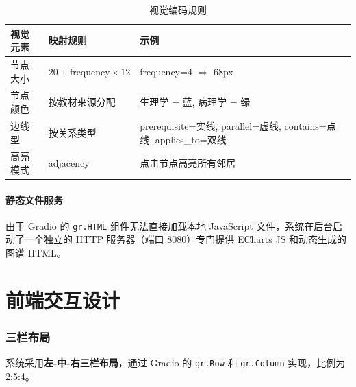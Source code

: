 \documentclass[12pt,a4paper]{article}
\begin{document}
\begin{table}[H]
\centering
\caption{视觉编码规则}
\begin{tabularx}{\textwidth}{llX}
\toprule
\textbf{视觉元素} & \textbf{映射规则} & \textbf{示例} \\
\midrule
节点大小 & $20 + \text{frequency} \times 12$ & frequency=4 $\Rightarrow$ 68px \\
节点颜色 & 按教材来源分配 & 生理学 = \textcolor[HTML]{5470C6}{蓝}, 病理学 = \textcolor[HTML]{91CC75}{绿} \\
边线型 & 按关系类型 & prerequisite=实线, parallel=虚线, contains=点线, applies\_to=双线 \\
高亮模式 & adjacency & 点击节点高亮所有邻居 \\
\bottomrule
\end{tabularx}
\end{table}

\subsection{静态文件服务}

由于 Gradio 的 \texttt{gr.HTML} 组件无法直接加载本地 JavaScript 文件，系统在后台启动了一个独立的 HTTP 服务器（端口 8080）专门提供 ECharts JS 和动态生成的图谱 HTML。


\newpage
\part{前端交互设计}

\section{三栏布局}
\label{sec:layout}

系统采用\textbf{左-中-右三栏布局}，通过 Gradio 的 \texttt{gr.Row} 和 \texttt{gr.Column} 实现，比例为 2:5:4。
\end{document}
